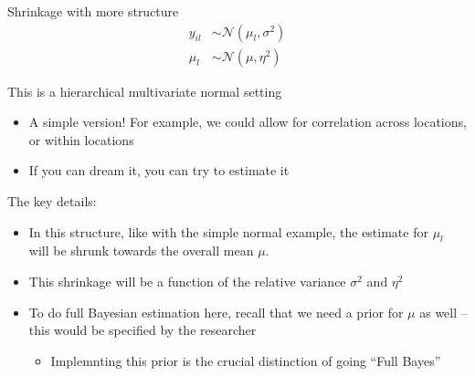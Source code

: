 \documentclass[notes,11pt, aspectratio=169]{beamer}
\newenvironment{wideitemize}{\itemize\addtolength{\itemsep}{10pt}}{\enditemize}
\begin{document}
\begin{frame}{Shrinkage with more structure}
    \begin{align*}
      y_{il} &\sim \mathcal{N}(\mu_{l}, \sigma^{2})\\
      \mu_{l} &\sim \mathcal{N}(\mu, \eta^{2})
    \end{align*}
  \begin{wideitemize}
  \item This is a hierarchical multivariate normal setting
    \begin{itemize}
    \item A simple version! For example, we could allow for
      correlation across locations, or within locations
    \item If you can dream it, you can try to estimate it
    \end{itemize}
  \item The key details:
    \begin{itemize}
    \item In this structure, like with the simple normal example, the
      estimate for $\mu_{l}$ will be shrunk towards the overall mean
      $\mu$. 
    \item This shrinkage will be a function of the relative variance $\sigma^{2}$ and $\eta^{2}$
    \item To do full Bayesian estimation here, recall that we need a
      prior for $\mu$ as well -- this would be specified by the
      researcher
      \begin{itemize}
      \item Implemnting this prior is the crucial distinction of going
        ``Full Bayes''
      \end{itemize}
    \end{itemize}
  \end{wideitemize}
\end{frame}

\end{document}
